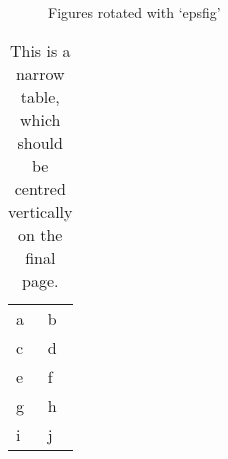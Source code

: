 \documentclass[twoside]{article}
\begin{document}
\begin{figure}
\begin{example}
\end{example}

\caption{Figures rotated with `epsfig'\label{fig2}}
\end{figure}
\begin{sidewaystable}
\centering
\caption{This is a narrow  table, which should be centred vertically
on the final page.\label{rotfloat1}}
  \begin{tabular}{|ll|}
\hline
    a & b \\
    c & d \\
    e & f \\
    g & h \\
    i & j \\
\hline
  \end{tabular}
\end{sidewaystable}
\end{document}
